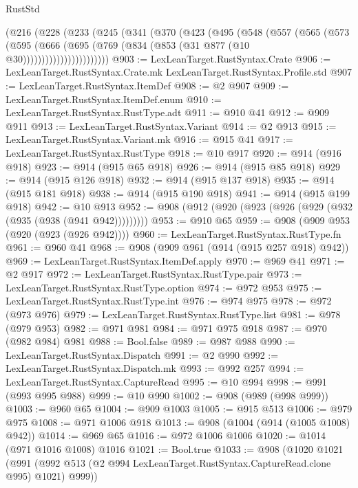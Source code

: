 \begin{lexlean}{RustStd}
\begin{coremodule}
          (@216
            (@228
              (@233
                (@245
                  (@341
                    (@370
                      (@423
                        (@495
                          (@548
                            (@557
                              (@565
                                (@573
                                  (@595
                                    (@666
                                      (@695
                                        (@769 (@834 (@853 (@31 @877 (@10 @30)))))))))))))))))))))))
@903 := LexLeanTarget.RustSyntax.Crate
@906 := LexLeanTarget.RustSyntax.Crate.mk LexLeanTarget.RustSyntax.Profile.std
@907 := LexLeanTarget.RustSyntax.ItemDef
@908 := @2 @907
@909 := LexLeanTarget.RustSyntax.ItemDef.enum
@910 := LexLeanTarget.RustSyntax.RustType.adt
@911 := @910 @41
@912 := @909 @911
@913 := LexLeanTarget.RustSyntax.Variant
@914 := @2 @913
@915 := LexLeanTarget.RustSyntax.Variant.mk
@916 := @915 @41
@917 := LexLeanTarget.RustSyntax.RustType
@918 := @10 @917
@920 := @914 (@916 @918)
@923 := @914 (@915 @65 @918)
@926 := @914 (@915 @85 @918)
@929 := @914 (@915 @126 @918)
@932 := @914 (@915 @137 @918)
@935 := @914 (@915 @181 @918)
@938 := @914 (@915 @190 @918)
@941 := @914 (@915 @199 @918)
@942 := @10 @913
@952 := @908 (@912 (@920 (@923 (@926 (@929 (@932 (@935 (@938 (@941 @942)))))))))
@953 := @910 @65
@959 := @908 (@909 @953 (@920 (@923 (@926 @942))))
@960 := LexLeanTarget.RustSyntax.RustType.fn
@961 := @960 @41
@968 := @908 (@909 @961 (@914 (@915 @257 @918) @942))
@969 := LexLeanTarget.RustSyntax.ItemDef.apply
@970 := @969 @41
@971 := @2 @917
@972 := LexLeanTarget.RustSyntax.RustType.pair
@973 := LexLeanTarget.RustSyntax.RustType.option
@974 := @972 @953
@975 := LexLeanTarget.RustSyntax.RustType.int
@976 := @974 @975
@978 := @972 (@973 @976)
@979 := LexLeanTarget.RustSyntax.RustType.list
@981 := @978 (@979 @953)
@982 := @971 @981
@984 := @971 @975 @918
@987 := @970 (@982 @984) @981
@988 := Bool.false
@989 := @987 @988
@990 := LexLeanTarget.RustSyntax.Dispatch
@991 := @2 @990
@992 := LexLeanTarget.RustSyntax.Dispatch.mk
@993 := @992 @257
@994 := LexLeanTarget.RustSyntax.CaptureRead
@995 := @10 @994
@998 := @991 (@993 @995 @988)
@999 := @10 @990
@1002 := @908 (@989 (@998 @999))
@1003 := @960 @65
@1004 := @909 @1003
@1005 := @915 @513
@1006 := @979 @975
@1008 := @971 @1006 @918
@1013 := @908 (@1004 (@914 (@1005 @1008) @942))
@1014 := @969 @65
@1016 := @972 @1006 @1006
@1020 := @1014 (@971 @1016 @1008) @1016
@1021 := Bool.true
@1033 := @908
    (@1020
      @1021
      (@991 (@992 @513 (@2 @994 LexLeanTarget.RustSyntax.CaptureRead.clone @995) @1021) @999))

\end{coremodule}
\end{lexlean}
